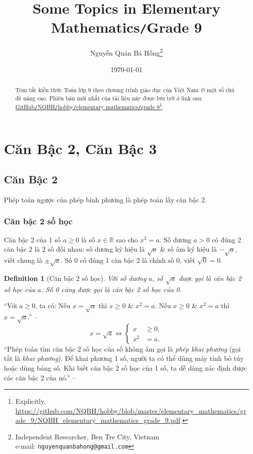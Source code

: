 \documentclass{article}
\title{Some Topics in Elementary Mathematics\texttt{/}Grade 9}
\author{Nguyễn Quản Bá Hồng\footnote{Independent Researcher, Ben Tre City, Vietnam\\e-mail: \texttt{nguyenquanbahong@gmail.com}}}
\date{\today}
\numberwithin{equation}{section}
\newtheorem{definition}{Definition}[section]
\begin{document}
\maketitle
\begin{abstract}
	Tóm tắt kiến thức Toán lớp 9 theo chương trình giáo dục của Việt Nam \textit{\&} một số chủ đề nâng cao. Phiên bản mới nhất của tài liệu này được lưu trữ ở link sau: \href{https://github.com/NQBH/hobby/blob/master/elementary_mathematics/grade_9/NQBH_elementary_mathematics_grade_9.pdf}{GitHub\texttt{/}NQBH\texttt{/}hobby\texttt{/}elementary mathematics\texttt{/}grade 9}\footnote{Explicitly, \url{https://github.com/NQBH/hobby/blob/master/elementary_mathematics/grade_9/NQBH_elementary_mathematics_grade_9.pdf}.}.
\end{abstract}
\setcounter{secnumdepth}{4}
\setcounter{tocdepth}{3}
\tableofcontents

\section{Căn Bậc 2, Căn Bậc 3}

\subsection{Căn Bậc 2}
Phép toán ngược của phép bình phương là phép toán lấy căn bậc 2.

\subsubsection{Căn bậc 2 số học}
Căn bậc 2 của 1 số $a\ge 0$ là số $x\in\mathbb{R}$ sao cho $x^2 = a$. Số dương $a > 0$ có đúng 2 căn bậc 2 là 2 số đối nhau: số dương ký hiệu là $\sqrt{a}$ \& số âm ký hiệu là $-\sqrt{a}$, viết chung là $\pm\sqrt{a}$. Số 0 có đúng 1 căn bậc 2 là chính số 0, viết $\sqrt{0} = 0$.

\begin{definition}[Căn bậc 2 số học]
	Với số dương $a$, số $\sqrt{a}$ được gọi là \emph{căn bậc 2 số học} của $a$. Số 0 cũng được gọi là \emph{căn bậc 2 số học của 0}.
\end{definition}
``Với $a\ge 0$, ta có: Nếu $x = \sqrt{a}$ thì $x\ge 0$ \& $x^2 = a$. Nếu $x\ge 0$ \& $x^2 = a$ thì $x = \sqrt{a}$.'' -- \cite[p. 4]{SGK_Toan_9_tap_1}
\begin{equation*}
	x = \sqrt{a}\Leftrightarrow\left\{\begin{split}
		x&\ge 0,\\
		x^2 &= a.
	\end{split}\right.
\end{equation*}
``Phép toán tìm căn bậc 2 số học của số không âm gọi là \textit{phép khai phương} (gọi tắt là \textit{khai phương}). Để khai phương 1 số, người ta có thể dùng máy tính bỏ túy hoặc dùng bảng số. Khi biết căn bậc 2 số học của 1 số, ta dễ dàng xác định được các căn bậc 2 của nó.'' -- \cite[p. 5]{SGK_Toan_9_tap_1}
\end{document}
